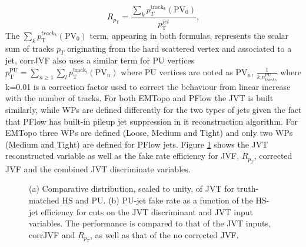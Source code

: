 \begin{equation}
    R_{p_{\mathrm{T}}}=\frac{\sum_{k} p_{T}^{\mathrm{track}_{k}}\left(\mathrm{PV}_{0}\right)}{p_{\mathrm{T}}^{j e t}},
\end{equation}
The  $\sum_{k} p_{\mathrm{T}}^{{track}_{k}}\left(\mathrm{PV}_{0}\right)$ term, appearing in both formulas, represents the scalar sum of tracks $p_T$ originating from the hard scattered vertex and associated to a jet, corrJVF also uses a similar term for PU vertices $p_{\mathrm{T}}^{\mathrm{PU}}=\sum_{n \geq 1} \sum_{l} p_{\mathrm{T}}^{\mathrm{track}_{l}}\left(\mathrm{PV}_{n}\right)$  where PU vertices are noted as $\mathrm{PV}_{n}$, $\frac{1}{k . n_{tracks }^{\mathrm{PU}}}$ where k=0.01 is a correction factor used to correct the behaviour from linear increase with the number of tracks. For both EMTopo and PFlow the JVT is built similarly, while WPs are defined differently for the two types of jets given the fact that PFlow has built-in pileup jet suppression in it reconstruction algorithm. For EMTopo three WPs are defined (Loose, Medium and Tight) and only two WPs (Medium and Tight) are defined for PFlow jets. Figure \ref{fig:Jet:Tag:JVT} shows the JVT reconstructed variable as well as the fake rate efficiency for JVF, $R_{p_T}$, corrected JVF and the combined JVT discriminate variables.
\begin{figure}[htbp]
    \centering
    \caption{(a) Comparative distribution, scaled to unity, of JVT for truth-matched HS and PU. (b) PU-jet fake rate as a function of the HS-jet efficiency for cuts on the JVT discriminant and JVT input variables. The performance is compared to that of the JVT inputs, corrJVF and $R_{p_T}$, as well as that of the no corrected JVF.}
    \label{fig:Jet:Tag:JVT}
\end{figure}
